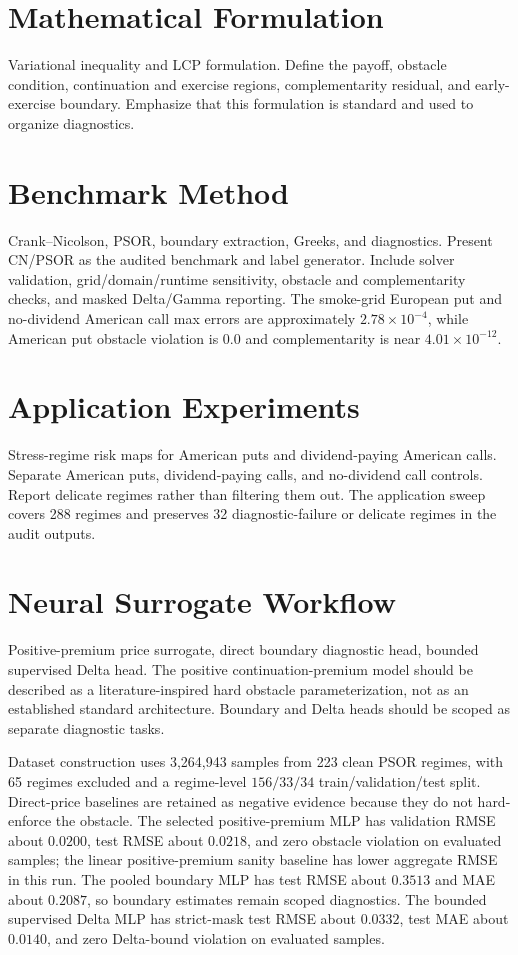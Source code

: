 \documentclass[11pt]{article}
\begin{document}
\section{Mathematical Formulation}
Variational inequality and LCP formulation. Define the payoff, obstacle condition, continuation and exercise regions, complementarity residual, and early-exercise boundary. Emphasize that this formulation is standard and used to organize diagnostics.

\section{Benchmark Method}
Crank--Nicolson, PSOR, boundary extraction, Greeks, and diagnostics. Present CN/PSOR as the audited benchmark and label generator. Include solver validation, grid/domain/runtime sensitivity, obstacle and complementarity checks, and masked Delta/Gamma reporting. The smoke-grid European put and no-dividend American call max errors are approximately $2.78\times10^{-4}$, while American put obstacle violation is $0.0$ and complementarity is near $4.01\times10^{-12}$.

\section{Application Experiments}
Stress-regime risk maps for American puts and dividend-paying American calls. Separate American puts, dividend-paying calls, and no-dividend call controls. Report delicate regimes rather than filtering them out. The application sweep covers 288 regimes and preserves 32 diagnostic-failure or delicate regimes in the audit outputs.

\section{Neural Surrogate Workflow}
Positive-premium price surrogate, direct boundary diagnostic head, bounded supervised Delta head. The positive continuation-premium model should be described as a literature-inspired hard obstacle parameterization, not as an established standard architecture. Boundary and Delta heads should be scoped as separate diagnostic tasks.

Dataset construction uses 3,264,943 samples from 223 clean PSOR regimes, with
65 regimes excluded and a regime-level \(156/33/34\)
train/validation/test split. Direct-price baselines are retained as negative
evidence because they do not hard-enforce the obstacle. The selected
positive-premium MLP has validation RMSE about \(0.0200\), test RMSE about
\(0.0218\), and zero obstacle violation on evaluated samples; the linear
positive-premium sanity baseline has lower aggregate RMSE in this run. The
pooled boundary MLP has test RMSE about \(0.3513\) and MAE about \(0.2087\),
so boundary estimates remain scoped diagnostics. The bounded supervised Delta
MLP has strict-mask test RMSE about \(0.0332\), test MAE about \(0.0140\), and
zero Delta-bound violation on evaluated samples.
\end{document}
